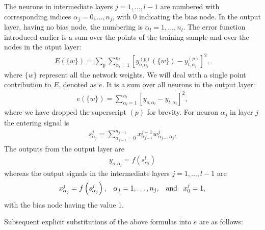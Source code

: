 \documentclass[letterpaper,10pt,english]{jupyterBook}
\begin{document}
\sphinxAtStartPar
The neurons in intermediate layers \(j=1,\dots,l-1\) are numbered with corresponding indices \(\alpha_j=0,\dots,n_j\), with 0 indicating the bias node. In the output layer, having no bias node, the numbering is \(\alpha_l=1,\dots,n_l\).
The error function introduced earlier is a sum over the points of the training sample and over the nodes in the otput layer:
\begin{equation*}
\begin{split}
E(\{w\})=\sum_p \sum_{\alpha_l=1}^{n_l} \left[ y_{o,{\alpha_l}}^{(p)}(\{w\})-y_{t,{\alpha_l}}^{(p)}\right]^2,
\end{split}
\end{equation*}
\sphinxAtStartPar
where \( \{w \} \) represent all the network weights.
We will deal with a single point contribution to \(E\), denoted as \( e \).
It is a sum over all neurons in the output layer:
\begin{equation*}
\begin{split}
e(\{w\})= \sum_{{\alpha_l}=1}^{n_l}\left[ y_{o,{\alpha_l}}-y_{t,{\alpha_l}}\right]^2, 
\end{split}
\end{equation*}
\sphinxAtStartPar
where we have dropped the superscript \((p)\) for brevity.
For neuron \(\alpha_j\) in layer \(j\) the entering signal is
\begin{equation*}
\begin{split}
s_{\alpha_j}^{j}=\sum_{\alpha_{j-1}=0}^{n_{j-1}} x_{\alpha_{j-1}}^{j-1} w_{\alpha_{j-1} \alpha_j}^{j}.
\end{split}
\end{equation*}
\sphinxAtStartPar
The outputs from the output layer are
\begin{equation*}
\begin{split}
y_{o,{\alpha_l}}=f\left( s_{\alpha_l}^{l} \right)
\end{split}
\end{equation*}
\sphinxAtStartPar
whereas the output signals in the intermediate layers \(j=1,\dots,l-1\) are
\begin{equation*}
\begin{split}
x_{\alpha_j}^{j}=f \left ( s_{\alpha_j}^{j}\right ),\;\;\;\alpha_{j}=1,\dots,n_j, \;\;\; {\rm and} \;\;\; x_0^{j}=1,
\end{split}
\end{equation*}
\sphinxAtStartPar
with the bias node having the value 1.

\sphinxAtStartPar
Subsequent explicit substitutions of the above formulas into \(e\) are as follows:
\end{document}
